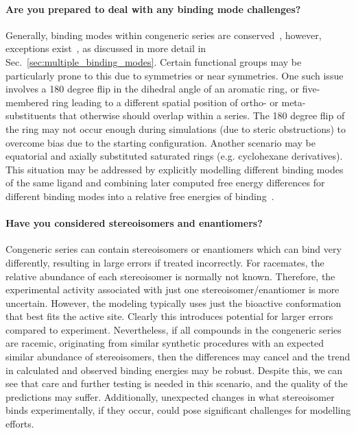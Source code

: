 \documentclass[9pt,bestpractices]{livecoms}
\begin{document}
\paragraph{Are you prepared to deal with any binding mode challenges?}
Generally, binding modes within congeneric series are conserved~\cite{wacker2010conserved}, however, exceptions exist~\cite{brandt2011congeneric,nazare2005probing}, as discussed in more detail in Sec.~\ref{sec:multiple_binding_modes}. Certain functional groups may be particularly prone to this due to symmetries or near symmetries. One such issue involves a 180 degree flip in the dihedral angle of an aromatic ring, or five-membered ring leading to a different spatial position of ortho- or meta- substituents that otherwise should overlap within a series. The 180 degree flip of the ring may not occur enough during simulations (due to steric obstructions) to overcome bias due to the starting configuration. Another scenario may be equatorial and axially substituted saturated rings (e.g. cyclohexane derivatives). This situation may be addressed by explicitly modelling different binding modes of the same ligand and combining later computed free energy differences for different binding modes into a relative free energies of binding~\cite{kaus2015how}.

\paragraph{Have you considered stereoisomers and enantiomers?}
Congeneric series can contain stereoisomers or enantiomers which can bind very differently, resulting in large errors if treated incorrectly. For racemates, the relative abundance of each stereoisomer is normally not known. Therefore, the experimental activity associated with just one stereoisomer/enantiomer is more uncertain. However, the modeling typically uses just the bioactive conformation that best fits the active site. Clearly this introduces potential for larger errors compared to experiment. Nevertheless, if all compounds in the congeneric series are racemic, originating from similar synthetic procedures with an expected similar abundance of stereoisomers, then the differences may cancel and the trend in calculated and observed binding energies may be robust. Despite this, we can see that care and further testing is needed in this scenario, and the quality of the predictions may suffer. Additionally, unexpected changes in what stereoisomer binds experimentally, if they occur, could pose significant challenges for modelling efforts.
\end{document}
